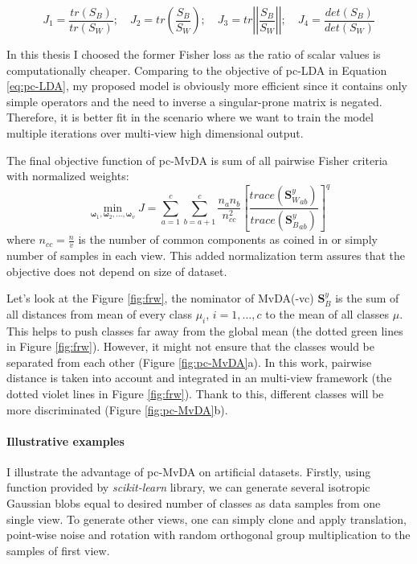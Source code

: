         \begin{equation}
            J_1=\frac{tr(S_B)}{tr(S_W)};\quad 
            J_2=tr\left(\frac{S_B}{S_W}\right);\quad
            J_3=tr\left|\left|\frac{S_B}{S_W}\right|\right|;\quad
            J_4=\frac{det(S_B)}{det(S_W)}
        \end{equation}

        In this thesis I choosed the former Fisher loss as the ratio of scalar values is computationally cheaper.
        Comparing to the objective of pc-LDA in Equation \eqref{eq:pc-LDA}, my proposed model is obviously more efficient since it contains only simple operators and the need to inverse a singular-prone matrix is negated.
        Therefore, it is better fit in the scenario where we want to train the model multiple iterations over multi-view high dimensional output.

        The final objective function of pc-MvDA is sum of all pairwise Fisher criteria with normalized weights:
        \begin{equation}
            \operatorname*{min}_{\boldsymbol{\omega}_1, \boldsymbol{\omega}_2,..., \boldsymbol{\omega}_v}{J}=\sum_{a=1}^{c}\sum_{b=a+1}^{c}{\frac{n_an_b}{n_{cc}^2}{\left[{\frac{trace\left({\boldsymbol{S}_W^y}_{ab}\right)}{trace\left({\boldsymbol{S}_B^y}_{ab}\right)}}\right]}^{q}}
            \label{eq:pc-MvDA}
        \end{equation}
        where $n_{cc} = \frac{n}{v}$ is the number of common components as coined in \cite{you2019multi} or simply number of samples in each view. This added normalization term assures that the objective does not depend on size of dataset.

        Let's look at the Figure \ref{fig:frw}, the nominator of MvDA(-vc) $\boldsymbol{S}_B^y$ is the sum of all distances from mean of every class $\mu_i$, $i = {1,...,c}$ to the mean of all classes $\mu$.
        This helps to push classes far away from the global mean (the dotted green lines in Figure \ref{fig:frw}).
        However, it might not ensure that the classes would be separated from each other (Figure \ref{fig:pc-MvDA}a).
        In this work, pairwise distance is taken into account and integrated in an multi-view framework (the dotted violet lines in Figure \ref{fig:frw}).
        Thank to this, different classes will be more discriminated (Figure \ref{fig:pc-MvDA}b).

    \paragraph{Illustrative examples}
        I illustrate the advantage of pc-MvDA on artificial datasets.
        Firstly, using function provided by \textit{scikit-learn} library, we can generate several isotropic Gaussian blobs equal to desired number of classes as data samples from one single view.  %
        To generate other views, one can simply clone and apply translation, point-wise noise and rotation with random orthogonal group multiplication to the samples of first view.

